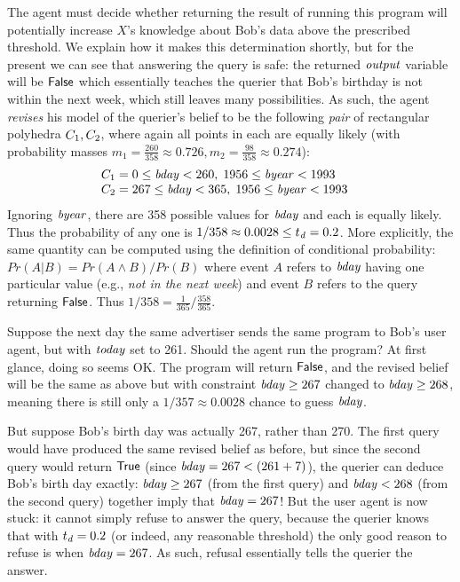 The agent must decide whether returning the result of running this
program will potentially increase $X$'s knowledge about Bob's data
above the prescribed threshold.  We explain how it makes this
determination shortly, but for the present we can see that answering
the query is safe: the returned $\mathit{output}$ variable will be
$\mathsf{False}$ which essentially teaches the querier that Bob's birthday is
not within the next week, which still leaves many possibilities.  As
such, the agent \emph{revises} his model of the querier's belief to be
the following \emph{pair} of rectangular polyhedra $C_{1},
C_{2}$, where again all points in each are equally likely (with
probability masses $m_1 = \frac{260}{358} \approx 0.726, m_2 =
\frac{98}{358} \approx 0.274$):
$$
\begin{array}{l}
C_{1} = 0 \leq \mathit{bday} < 260,\; 1956 \leq \mathit{byear} < 1993 \quad \\
C_{2} = 267 \leq \mathit{bday} < 365,\; 1956 \leq \mathit{byear} <  1993 \quad \\
\end{array}
$$ Ignoring $\mathit{byear}$, there are 358 possible values for
$\mathit{bday}$ and each is equally likely. Thus the probability of any
one is $1 / 358 \approx 0.0028 \leq t_{\mathit{d}} = 0.2$. More
explicitly, the same quantity can be computed using the definition of
conditional probability: $ Pr(A | B) = Pr(A \wedge B) / Pr(B) $ where
event $ A $ refers to $\mathit{bday} $ having one particular value (e.g.,
\emph{not
in the next week}) and event $ B $ refers to the query returning $
\mathsf{False} $. Thus $ 1 / 358 = \frac{1}{365} / \frac{358}{365}
$.

Suppose the next day the same advertiser sends the same program to
Bob's user agent, but with $\mathit{today}$ set to 261.  Should the agent
run the program?  At first glance, doing so seems OK.  The program
will return $\mathsf{False}$, and the revised belief will be the same as
above but with constraint $\mathit{bday} \geq 267$ changed to $\mathit{bday}
\geq 268$, meaning there is still only a $1 / 357 \approx 0.0028$
chance to guess $\mathit{bday}$.

But suppose Bob's birth day was actually 267, rather than 270.  The
first query would have produced the same revised belief as before, but
since the second query would return $\mathsf{True}$ (since $\mathit{bday}=267 <
(261 + 7)$), the querier can deduce Bob's birth day exactly:
$\mathit{bday} \geq 267$ (from the first query) and $\mathit{bday} < 268$
(from the second query) together imply that $\mathit{bday} = 267$!  But
the user agent is now stuck: it cannot simply refuse to answer the
query, because the querier knows that with $t_{\mathit{d}} = 0.2$ (or
indeed, any reasonable threshold) the only good reason to refuse is
when $\mathit{bday} = 267$.  As such, refusal essentially tells the
querier the answer.

